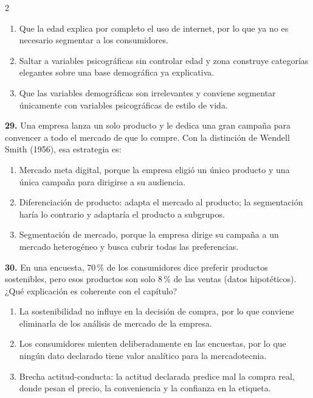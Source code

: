 \documentclass[10pt,letterpaper]{article}
\begin{document}
\begin{multicols}{2}
\begin{enumerate}[label=\alph*),leftmargin=1.1em,itemsep=0pt,topsep=1pt,parsep=0pt,partopsep=0pt]
\item Que la edad explica por completo el uso de internet, por lo que ya no es necesario segmentar a los consumidores.
\item Saltar a variables psicográficas sin controlar edad y zona construye categorías elegantes sobre una base demográfica ya explicativa.
\item Que las variables demográficas son irrelevantes y conviene segmentar únicamente con variables psicográficas de estilo de vida.
\end{enumerate}
\vspace{2pt}
\noindent\textbf{29.} Una empresa lanza un solo producto y le dedica una gran campaña para convencer a todo el mercado de que lo compre. Con la distinción de Wendell Smith (1956), esa estrategia es:
\vspace{-3pt}
\begin{enumerate}[label=\alph*),leftmargin=1.1em,itemsep=0pt,topsep=1pt,parsep=0pt,partopsep=0pt]
\item Mercado meta digital, porque la empresa eligió un único producto y una única campaña para dirigirse a su audiencia.
\item Diferenciación de producto: adapta el mercado al producto; la segmentación haría lo contrario y adaptaría el producto a subgrupos.
\item Segmentación de mercado, porque la empresa dirige su campaña a un mercado heterogéneo y busca cubrir todas las preferencias.
\end{enumerate}
\vspace{2pt}
\noindent\textbf{30.} En una encuesta, 70\,\% de los consumidores dice preferir productos sostenibles, pero esos productos son solo 8\,\% de las ventas (datos hipotéticos). ¿Qué explicación es coherente con el capítulo?
\vspace{-3pt}
\begin{enumerate}[label=\alph*),leftmargin=1.1em,itemsep=0pt,topsep=1pt,parsep=0pt,partopsep=0pt]
\item La sostenibilidad no influye en la decisión de compra, por lo que conviene eliminarla de los análisis de mercado de la empresa.
\item Los consumidores mienten deliberadamente en las encuestas, por lo que ningún dato declarado tiene valor analítico para la mercadotecnia.
\item Brecha actitud-conducta: la actitud declarada predice mal la compra real, donde pesan el precio, la conveniencia y la confianza en la etiqueta.
\end{enumerate}
\vspace{2pt}
\end{multicols}
\end{document}
